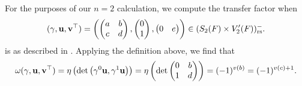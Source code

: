 For the purposes of our $n=2$ calculation, we compute the transfer factor when
\[ {(\gamma, \mathbf u, \mathbf v^\top)} = \left( \begin{pmatrix} a & b \\ c & d \end{pmatrix},
  \begin{pmatrix} 0 \\ 1 \end{pmatrix}, \begin{pmatrix} 0 & e \end{pmatrix} \right)
  \in (S_2(F) \times V'_2(F))_{\mathrm{rs}}^-. \]
is as described in .
Applying the definition above, we find that
\begin{equation}
    \omega{(\gamma, \mathbf u, \mathbf v^\top)}
    = \eta\left( \det
      \left( \gamma^0 \mathbf u, \gamma^1 \mathbf u \right)
    \right)
    = \eta\left( \det
      \begin{pmatrix} 0 & b \\ 1 & d \end{pmatrix}
    \right)
    = (-1)^{v(b)} = (-1)^{v(c)+1}.
  \label{eq:semi_lie_transfer}
\end{equation}

